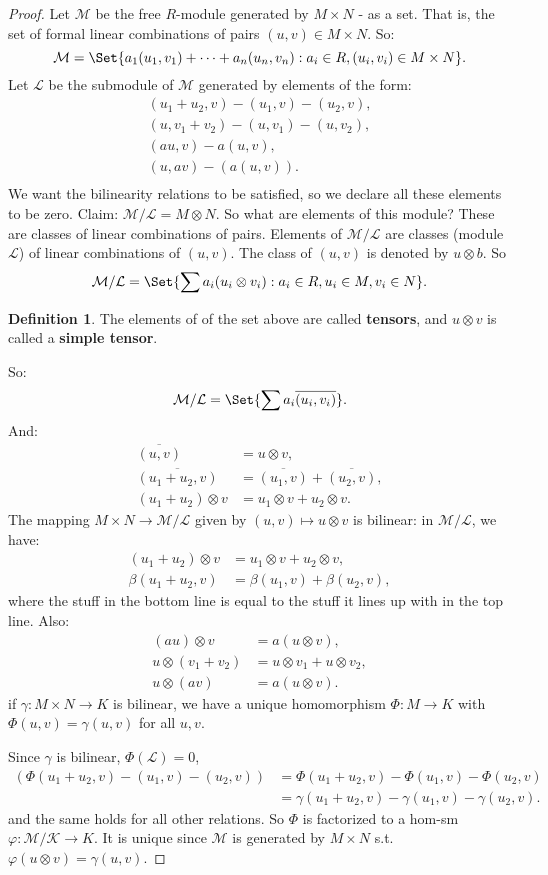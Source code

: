 \documentclass[9pt,reqno,twoside]{amsbook}
\theoremstyle{plain}
\numberwithin{section}{chapter}
\numberwithin{equation}{chapter}
\theoremstyle{definition}
\newtheorem{Def}[theorem]{Definition}
\theoremstyle{remark}
\theoremstyle{plain}
\newcommand{\bee}{\begin{equation}\begin{aligned}}
\newcommand{\eee}{\end{aligned}\end{equation}}
\newcommand{\ten}{\otimes} %
\renewcommand{\phi}{\varphi}
\begin{document}
 
 \begin{proof}
 Let $\mathcal{M}$ be the free $R$-module generated by $M \times N$ - as a set. That is, the set of formal linear combinations of pairs $(u,v) \in M \times N$. So:
 $$
 \mathcal{M} = \Set{a_1(u_1,v_1) + \cdots + a_n(u_n,v_n):a_i \in R, (u_i,v_i) \in M \times N}.
 $$
 Let $\mathcal{L}$ be the submodule of $\mathcal{M}$ generated by elements of the form: 
 \bee
 (u_1 + u_2,v) - (u_1,v) - (u_2,v),\\(u,v_1 + v_2) - (u,v_1) - (u,v_2),\\
 (au,v) - a(u,v),\\
 (u,av) - (a(u,v)).\\
 \eee
 We want the bilinearity relations to be satisfied, so we declare all these elements to be zero. 
 Claim: $\mathcal{M}/\mathcal{L} = M \otimes N$. So what are elements of this module? These are classes of linear combinations of pairs. Elements of $\mathcal{M}/\mathcal{L}$ are classes (module $\mathcal{L}$) of linear combinations of $(u,v)$. The class of $(u,v)$ is denoted by $u \otimes b$. So 
 $$
 \mathcal{M}/\mathcal{L} = \Set{\sum a_i(u_i \otimes v_i): a_i \in R, u_i \in M,v_i \in N}.
 $$
 
 \begin{Def}The elements of of the set above are called \textbf{tensors}, and $u \otimes v$ is called a \textbf{simple tensor}. 
 \end{Def}
 So:
  $$
 \mathcal{M}/\mathcal{L} = \Set{\sum a_i\overline{(u_i,v_i)}}.
 $$
 And:
 \bee
 \overline{(u,v)} &= u \otimes v,\\
 \overline{(u_1 + u_2,v)} &= \overline{(u_1,v)} + \overline{(u_2,v)},\\
 (u_1 + u_2) \otimes v &= u_1 \otimes v + u_2 \otimes v.
 \eee
 The mapping $M \times N \to \mathcal{M}/\mathcal{L}$ given by $(u,v) \mapsto u \otimes v$ is bilinear: in $\mathcal{M}/\mathcal{L}$, we have:
 \bee
 (u_1 + u_2) \otimes v &= u_1 \otimes v + u_2 \otimes v,\\
 \beta(u_1 + u_2,v) &= \beta(u_1,v) + \beta(u_2,v),
 \eee
 where the stuff in the bottom line is equal to the stuff it lines up with in the top line. Also: 
 \bee
 (au) \otimes v &= a(u \otimes v),\\
 u \otimes (v_1 + v_2) &= u\otimes v_1 
+ u\otimes v_2,\\
u\otimes (av) &= a(u \otimes v).
\eee
if $\gamma:M \times N \to K$ is bilinear, we have a unique homomorphism $\Phi: M \to K$ with $\Phi(u,v) = \gamma(u,v)$ for all $u,v$. 

Since $\gamma$ is bilinear, $\Phi(\mathcal{L}) = 0$,
\bee
(\Phi(u_1 + u_2,v) - (u_1,v) - (u_2,v)) 
&= \Phi(u_1 + u_2,v) - \Phi(u_1,v) - \Phi(u_2,v)\\
&= \gamma(u_1 + u_2,v) - \gamma(u_1,v) - \gamma(u_2,v).
\eee
and the same holds for all other relations. So $\Phi$ is factorized to a hom-sm $\phi: \mathcal{M}/\mathcal{K} \to K$. It is unique since $\mathcal{M}$ is generated by $M \times N$ s.t. $\phi(u \ten v) = \gamma(u,v)$. 
 \end{proof}
 
\end{document}
